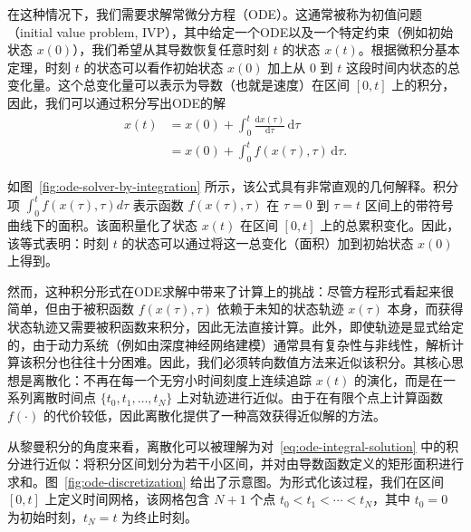 \documentclass[UTF8,a4paper,zihao=-4,oneside,openany]{ctexbook}
\begin{document}
在这种情况下，我们需要求解常微分方程（ODE）。这通常被称为初值问题（initial value problem, IVP），其中给定一个ODE以及一个特定约束（例如初始状态 $x(0)$），我们希望从其导数恢复任意时刻 $t$ 的状态 $x(t)$。根据微积分基本定理，时刻 \(t\) 的状态可以看作初始状态 \(x(0)\) 加上从 \(0\) 到 \(t\) 这段时间内状态的总变化量。这个总变化量可以表示为导数（也就是速度）在区间 \([0,t]\) 上的积分，因此，我们可以通过积分写出ODE的解
\begin{equation}
\begin{aligned}
x(t)
&= x(0)+\int_0^t \frac{\mathrm{d}x(\tau)}{\mathrm{d}\tau}\,\mathrm{d}\tau \\
&= x(0)+\int_0^t f(x(\tau),\tau)\,\mathrm{d}\tau .
\end{aligned}
\label{eq:ode-integral-solution}
\end{equation}

如图~\ref{fig:ode-solver-by-integration} 所示，该公式具有非常直观的几何解释。积分项 $\int_0^t f(x(\tau),\tau)d\tau$ 表示函数 $f(x(\tau),\tau)$ 在 $\tau=0$ 到 $\tau=t$ 区间上的带符号曲线下的面积。该面积量化了状态 $x(t)$ 在区间 $[0,t]$ 上的总累积变化。因此，该等式表明：时刻 $t$ 的状态可以通过将这一总变化（面积）加到初始状态 $x(0)$ 上得到。

然而，这种积分形式在ODE求解中带来了计算上的挑战：尽管方程形式看起来很简单，但由于被积函数 $f(x(\tau),\tau)$ 依赖于未知的状态轨迹 $x(\tau)$ 本身，而获得状态轨迹又需要被积函数来积分，因此无法直接计算。此外，即使轨迹是显式给定的，由于动力系统（例如由深度神经网络建模）通常具有复杂性与非线性，解析计算该积分也往往十分困难。因此，我们必须转向数值方法来近似该积分。其核心思想是离散化：不再在每一个无穷小时间刻度上连续追踪 $x(t)$ 的演化，而是在一系列离散时间点 $\{t_0,t_1,\ldots,t_N\}$ 上对轨迹进行近似。由于在有限个点上计算函数 $f(\cdot)$ 的代价较低，因此离散化提供了一种高效获得近似解的方法。

从黎曼积分的角度来看，离散化可以被理解为对~\eqref{eq:ode-integral-solution} 中的积分进行近似：将积分区间划分为若干小区间，并对由导数函数定义的矩形面积进行求和。图~\ref{fig:ode-discretization} 给出了示意图。为形式化该过程，我们在区间 $[0,t]$ 上定义时间网格，该网格包含 $N+1$ 个点 $t_0<t_1<\cdots<t_N$，其中 $t_0=0$ 为初始时刻，$t_N=t$ 为终止时刻。
\end{document}
